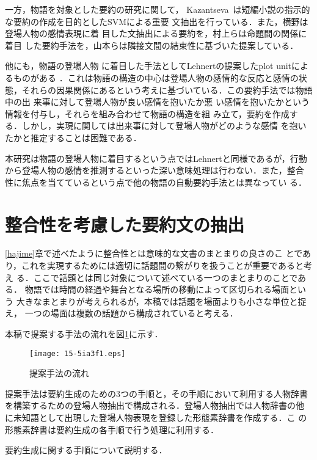 \documentclass[japanese]{jnlp_1.4}
\begin{document}
 一方，物語を対象とした要約の研究に関して，
 Kazantseva~\cite{Anna}は短編小説の指示的な要約の作成を目的としたSVMによる重要
 文抽出を行っている．また，横野\cite{yokono2007}は登場人物の感情表現に着
 目した文抽出による要約を，村上ら\cite{murakami2004}は命題間の関係に着目
 した要約手法を，山本ら\cite{syousetu}は隣接文間の結束性に基づいた提案している．
 
 他にも，物語の登場人物
 に着目した手法としてLehnertの提案したplot unitによるものがある
 \cite{plotunit}．これは物語の構造の中心は登場人物の感情的な反応と感情の状
 態，それらの因果関係にあるという考えに基づいている．この要約手法では物語中の出
来事に対して登場人物が良い感情を抱いたか悪
 い感情を抱いたかという情報を付与し，それらを組み合わせて物語の構造を組
 み立て，要約を作成する．しかし，実現に関しては出来事に対して登場人物がどのような感情
 を抱いたかと推定することは困難である．

 本研究は物語の登場人物に着目するという点ではLehnertと同様であるが，行動
 から登場人物の感情を推測するといった深い意味処理は行わない．また，整合
 性に焦点を当てているという点で他の物語の自動要約手法とは異なってい
 る．


 \section{整合性を考慮した要約文の抽出}\label{method}

 \ref{hajime}章で述べたように整合性とは意味的な文書のまとまりの良さのこ
 とであり，これを実現するためには適切に話題間の繋がりを扱うことが重要であると考え
 る．ここで話題とは同じ対象について述べている一つのまとまりのことである．
 物語では時間の経過や舞台となる場所の移動によって区切られる場面という
 大きなまとまりが考えられるが，本稿では話題を場面よりも小さな単位と捉え，
 一つの場面は複数の話題から構成されていると考える．

 本稿で提案する手法の流れを図\ref{flow}に示す．
 \begin{figure}[b]
  \begin{center}
   \texttt{[image: 15-5ia3f1.eps]}
  \end{center}
 \caption{提案手法の流れ}
  \label{flow}
 \end{figure}

 提案手法は要約生成のための3つの手順と，その手順において利用する人物辞書
 を構築するための登場人物抽出で構成される．登場人物抽出では人物辞書の他
 に未知語として出現した登場人物表現を登録した形態素辞書を作成する．こ
 の形態素辞書は要約生成の各手順で行う処理に利用する．

 要約生成に関する手順について説明する．
 
\end{document}
